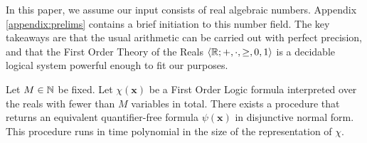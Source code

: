 In this paper, we assume our input consists of real algebraic numbers. Appendix \ref{appendix:prelims} contains a brief initiation to this number field. The key takeaways are that the usual arithmetic can be carried out with perfect precision, and that the First Order Theory of the Reals $\langle\mathbb{R}; +, \cdot, \ge, 0, 1\rangle$ is a decidable logical system powerful enough to fit our purposes.

\begin{theorem}
\label{thm:renegar}
Let $M \in \mathbb{N}$ be fixed. Let $\chi(\mathbf{x})$ be a First Order Logic formula interpreted over the reals with fewer than $M$ variables in total. There exists a procedure that returns an equivalent quantifier-free formula $\psi(\mathbf{x})$ in disjunctive normal form. This procedure runs in time polynomial in the size of the representation of $\chi$.
\end{theorem} 

